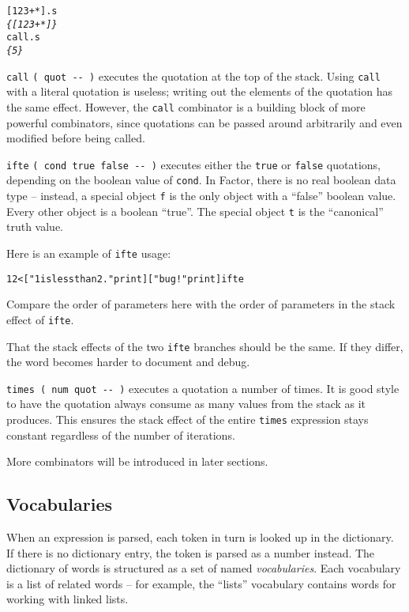 \documentclass[english]{article}
\begin{document}
\begin{alltt}
{[} 1 2 3 + {*} {]} .s
\emph{\{ {[} 1 2 3 + {*} {]} \}}
call .s
\emph{\{ 5 \}}
\end{alltt}
\texttt{call} \texttt{( quot -{}- )} executes the quotation at the
top of the stack. Using \texttt{call} with a literal quotation is
useless; writing out the elements of the quotation has the same effect.
However, the \texttt{call} combinator is a building block of more
powerful combinators, since quotations can be passed around arbitrarily
and even modified before being called.

\texttt{ifte} \texttt{( cond true false -{}- )} executes either the
\texttt{true} or \texttt{false} quotations, depending on the boolean
value of \texttt{cond}. In Factor, there is no real boolean data type
-- instead, a special object \texttt{f} is the only object with a
{}``false'' boolean value. Every other object is a boolean {}``true''.
The special object \texttt{t} is the {}``canonical'' truth value.

Here is an example of \texttt{ifte} usage:

\begin{alltt}
1 2 < {[} "1 is less than 2." print {]} {[} "bug!" print {]} ifte
\end{alltt}
Compare the order of parameters here with the order of parameters in
the stack effect of \texttt{ifte}.

That the stack effects of the two \texttt{ifte} branches should be
the same. If they differ, the word becomes harder to document and
debug.

\texttt{times ( num quot -{}- )} executes a quotation a number of
times. It is good style to have the quotation always consume as many
values from the stack as it produces. This ensures the stack effect
of the entire \texttt{times} expression stays constant regardless
of the number of iterations.

More combinators will be introduced in later sections.


\subsection{Vocabularies}

When an expression is parsed, each token in turn is looked up in the dictionary. If there is no dictionary entry, the token is parsed as a number instead.
The dictionary of words is structured as a set of named \emph{vocabularies}. Each vocabulary is a list
of related words -- for example, the {}``lists''
vocabulary contains words for working with linked lists.
\end{document}
